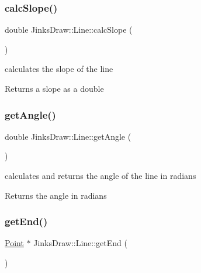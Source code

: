 \subsubsection{\texorpdfstring{calc\+Slope()}{calcSlope()}}
{\footnotesize\ttfamily double Jinks\+Draw\+::\+Line\+::calc\+Slope (\begin{DoxyParamCaption}{ }\end{DoxyParamCaption})}



calculates the slope of the line 

\begin{DoxyReturn}{Returns}
a slope as a double 
\end{DoxyReturn}
\mbox{\label{class_jinks_draw_1_1_line_ae344d8ad62e6044cfa2a5d31e1262d00}} 
\subsubsection{\texorpdfstring{get\+Angle()}{getAngle()}}
{\footnotesize\ttfamily double Jinks\+Draw\+::\+Line\+::get\+Angle (\begin{DoxyParamCaption}{ }\end{DoxyParamCaption})}



calculates and returns the angle of the line in radians 

\begin{DoxyReturn}{Returns}
the angle in radians 
\end{DoxyReturn}
\mbox{\label{class_jinks_draw_1_1_line_a6d0c3c1b398bbe5dcadecaff9e71720b}} 
\subsubsection{\texorpdfstring{get\+End()}{getEnd()}}
{\footnotesize\ttfamily \mbox{\hyperlink{class_jinks_draw_1_1_point}{Point}} $\ast$ Jinks\+Draw\+::\+Line\+::get\+End (\begin{DoxyParamCaption}{ }\end{DoxyParamCaption})}



